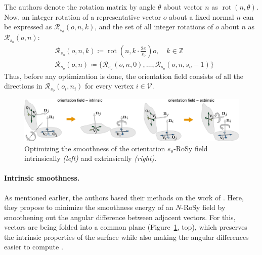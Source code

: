 \documentclass{ACGSeminar}
\DeclareMathOperator{\rot}{rot}
\begin{document}
The authors denote the rotation matrix by angle $\theta$ about vector $n$ as $\rot(n, \theta)$. Now, an integer rotation of a representative vector $o$ about a fixed normal $n$ can be expressed as $\mathcal{R}_{s_o}(o,n,k)$, and the set of all integer rotations of $o$ about $n$ as $\mathcal{R}_{s_o}(o,n)$:
\begin{equation*}
\begin{split}
	& \mathcal{R}_{s_o}(o,n,k) \coloneqq \rot \left(n, k \cdot \frac{2\pi}{s_o} \right) o, \quad k \in \mathbb{Z} \\
	& \mathcal{R}_{s_o}(o,n) \coloneqq \{\mathcal{R}_{s_o}(o,n,0), \dots, \mathcal{R}_{s_o}(o,n,s_o-1)\}
\end{split}
\end{equation*}
Thus, before any optimization is done, the orientation field consists of all the directions in $\mathcal{R}_{s_o}(o_i, n_i)$ for every vertex $i \in \mathcal{V}$.

\begin{figure}[htb!]
	\begin{centering}
		\includegraphics[width=\textwidth]{img/orientation-field-intrinsic-extrinsic-horizontal.png}\par
	\end{centering}
	\caption{Optimizing the smoothness of the orientation $s_o$-RoSy field intrinsically \textit{(left)} and extrinsically \textit{(right)}. \cite{jakob2015instant}}
	\label{fig:orientation-field-intrinsic-extrinsic}
\end{figure}

\paragraph{Intrinsic smoothness.}
As mentioned earlier, the authors based their methods on the work of \cite{ray2008n,bommes2009mixed}. Here, they propose to minimize the smoothness energy of an $N$-RoSy field by smoothening out the angular difference between adjacent vectors. For this, vectors are being folded into a common plane (Figure~\ref{fig:orientation-field-intrinsic-extrinsic}, top), which preserves the intrinsic properties of the surface while also making the angular differences easier to compute \cite{jakob2015instant}.\bigskip
\end{document}
